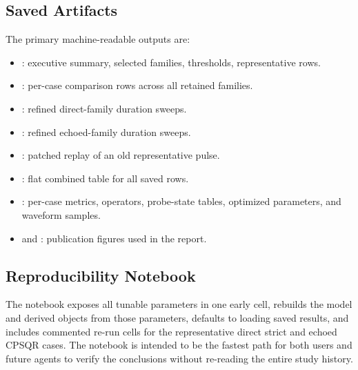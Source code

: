 \documentclass[aps,pra,twocolumn,reprint,floatfix,amsmath,amssymb]{revtex4-2}
\begin{document}
\subsection{Saved Artifacts}
The primary machine-readable outputs are:
\begin{itemize}
    \item {}: executive summary, selected families, thresholds, representative rows.
    \item {}: per-case comparison rows across all retained families.
    \item {}: refined direct-family duration sweeps.
    \item {}: refined echoed-family duration sweeps.
    \item {}: patched replay of an old representative pulse.
    \item {}: flat combined table for all saved rows.
    \item {}: per-case metrics, operators, probe-state tables, optimized parameters, and waveform samples.
    \item {} and : publication figures used in the report.
\end{itemize}

\subsection{Reproducibility Notebook}
The notebook exposes all tunable parameters in one early cell, rebuilds the model and derived objects from those parameters, defaults to loading saved results, and includes commented re-run cells for the representative direct strict and echoed CPSQR cases. The notebook is intended to be the fastest path for both users and future agents to verify the conclusions without re-reading the entire study history.
\end{document}
